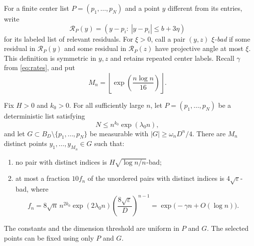 For a finite center list $P=(p_1,\ldots,p_N)$ and a point $y$ different
from its entries, write
\[
 \mathcal R_P(y)=(y-p_i:\ |y-p_i|\le b+3\eta)
\]
for its labeled list of relevant residuals.  For $\xi>0$, call a pair
$(y,z)$ \emph{$\xi$-bad} if some residual in $\mathcal R_P(y)$ and
some residual in $\mathcal R_P(z)$ have projective angle at most $\xi$.
This definition is symmetric in $y,z$ and retains repeated center labels.
Recall $\gamma$ from \eqref{eq:rates}, and put
\begin{equation}
 M_n=\left\lfloor\exp\left(\frac{n\log n}{16}\right)\right\rfloor.
\label{eq:target-count}
\end{equation}

\begin{lemma}
\label{lem:targets}
Fix $H>0$ and $k_0>0$.  For all sufficiently large $n$, let
$P=(p_1,\ldots,p_N)$ be a deterministic list satisfying
\[
 N\le n^{k_0}\exp(\lambda_0n),
\]
and let $G\subset B_D\setminus\{p_1,\ldots,p_N\}$ be measurable with
$|G|\ge\omega_nD^n/4$.
There are $M_n$ distinct points $y_1,\ldots,y_{M_n}\in G$ such that:
\begin{enumerate}[label=\textup{(\roman*)}]
\item no pair with distinct indices is
$H\sqrt{\log n/n}$-bad;
\item at most a fraction $10f_n$ of the unordered pairs with distinct
indices is $4\sqrt\varepsilon$-bad, where
\begin{equation}
 f_n=8\sqrt n\,n^{2k_0}\exp(2\lambda_0n)
       \left(\frac{8\sqrt\varepsilon}{D}\right)^{n-1}
     =\exp\bigl(-\gamma n+O(\log n)\bigr).
\label{eq:bad-pair-rate}
\end{equation}
\end{enumerate}
The constants and the dimension threshold are uniform in $P$ and $G$.
The selected points can be fixed using only $P$ and $G$.
\end{lemma}

